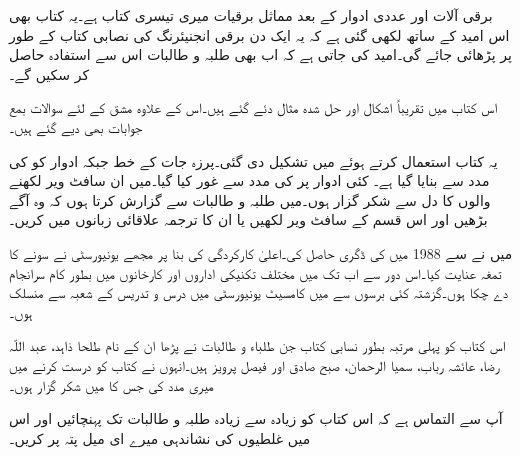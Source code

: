 \thispagestyle{empty}
برقی آلات اور عددی ادوار کے بعد مماثل برقیات میری تیسری کتاب ہے۔یہ کتاب بھی اس امید کے ساتھ لکھی گئی ہے کہ یہ ایک دن برقی انجنیئرنگ کی نصابی کتاب کے طور پر پڑھائی جائے گی۔امید کی جاتی ہے کہ اب بھی طلبہ و طالبات اس سے استفادہ حاصل کر سکیں گے۔

اس کتاب میں تقریباً  اشکال اور  حل شدہ مثال دئے گئے ہیں۔اس کے علاوہ  مشق کے لئے   سوالات  بمع جوابات بھی دیے گئے ہیں۔

یہ کتاب  استعمال  کرتے ہوئے  میں تشکیل دی گئی۔پرزہ جات کے خط  جبکہ ادوار کو  کی مدد سے بنایا گیا ہے۔ کئی ادوار پر  کی مدد سے غور کیا گیا۔میں ان سافٹ ویر لکھنے والوں کا دل سے شکر گزار ہوں۔میں طلبہ و طالبات سے گزارش  کرتا ہوں کہ وہ آگے بڑھیں اور اس قسم کے سافٹ ویر لکھیں یا ان کا ترجمہ علاقائی زبانوں میں کریں۔

میں نے   سے 1988 میں  کی ڈگری حاصل کی۔اعلیٰ کارکردگی کی بنا پر مجھے یونیورسٹی نے سونے کا تمغہ عنایت کیا۔اس دور سے اب تک میں  مختلف تکنیکی اداروں اور کارخانوں میں بطور  کام سرانجام دے چکا ہوں۔گزشتہ کئی برسوں سے میں کامسیٹ یونیورسٹی میں درس و تدریس کے شعبہ سے منسلک ہوں۔

اس کتاب کو پہلی مرتبہ بطور نسابی کتاب جن طلباء و طالبات نے پڑھا ان کے نام طلحا ذاہد، عبد اللّہ رضا، عائشہ رباب، سمیا الرحمان، صبح صادق اور فیصل پرویز ہیں۔انہوں نے کتاب کو درست کرنے میں میری مدد کی جس کا میں شکر گزار ہوں۔

آپ سے التماس ہے کہ اس کتاب کو زیادہ سے زیادہ طلبہ و طالبات تک پہنچائیں اور اس میں غلطیوں کی نشاندہی میرے ای میل پتہ پر کریں۔
\vspace{5mm}

{}
